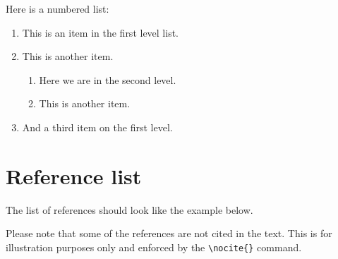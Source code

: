 \documentclass[a4paper,11pt,article,oneside]{memoir}
\begin{document}
Here is a numbered list:

\begin{enumerate}
\item This is an item in the first level list.
\item This is another item.
  \begin{enumerate}
  \item Here we are in the second level.
  \item This is another item.
  \end{enumerate}
\item And a third item on the first level.
\end{enumerate}

\section{Reference list}

The list of references should look like the example below.

Please note that some of the references are not cited in the text. This is for illustration purposes only and enforced by the \texttt{\textbackslash{}nocite\{\}} command.

\nocite{Geron2013,Delfmann2007a,Mendling2005}


%





\printbibliography
\end{document}
